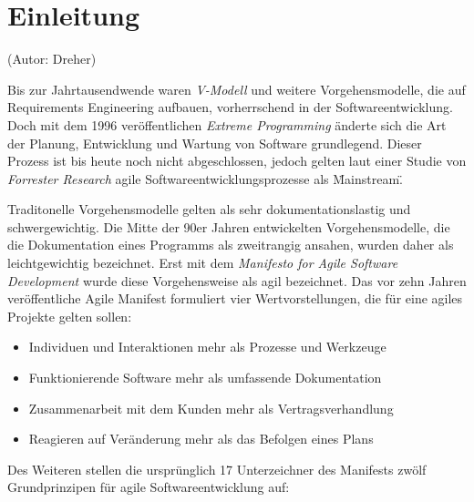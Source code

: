 \section{Einleitung}
(Autor: Dreher)

Bis zur Jahrtausendwende waren \emph{V-Modell} und weitere Vorgehensmodelle, die auf Requirements Engineering aufbauen, vorherrschend in der Softwareentwicklung. Doch mit dem 1996 veröffentlichen \emph{Extreme Programming} änderte sich die Art der Planung, Entwicklung und Wartung von Software grundlegend. Dieser Prozess ist bis heute noch nicht abgeschlossen, jedoch gelten laut einer Studie von \emph{Forrester Research} agile Softwareentwicklungsprozesse als \"Mainstream\". \cite{bib:ane}

Traditonelle Vorgehensmodelle gelten als sehr dokumentationslastig und schwergewichtig. Die Mitte der 90er Jahren entwickelten Vorgehensmodelle, die die Dokumentation eines Programms als zweitrangig ansahen, wurden daher als leichtgewichtig bezeichnet. Erst mit dem \emph{Manifesto for Agile Software Development} \cite{bib:manifest} wurde diese Vorgehensweise als agil bezeichnet. \cite{bib:eckstein} Das vor zehn Jahren veröffentliche Agile Manifest formuliert vier Wertvorstellungen, die für eine agiles Projekte gelten sollen:
\begin{itemize}
	\item Individuen und Interaktionen mehr als Prozesse und Werkzeuge
	\item Funktionierende Software mehr als umfassende Dokumentation
	\item Zusammenarbeit mit dem Kunden mehr als Vertragsverhandlung
	\item Reagieren auf Veränderung mehr als das Befolgen eines Plans
\end{itemize}
Des Weiteren stellen die ursprünglich 17 Unterzeichner des Manifests zwölf Grundprinzipen für agile Softwareentwicklung auf:
